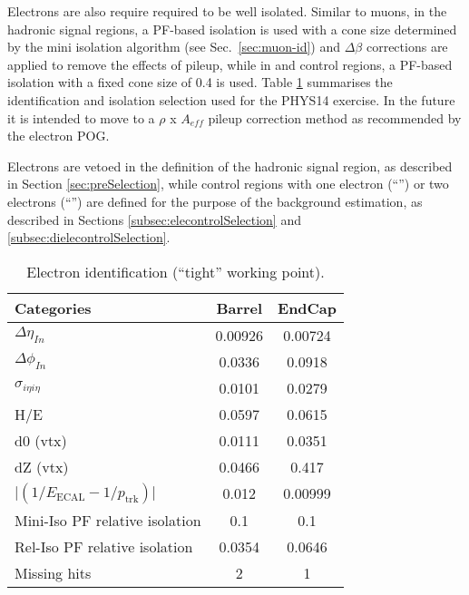 Electrons are also require required to be well isolated. 
Similar to muons, in the hadronic signal regions, a PF-based isolation \cite{pf-photon} is used with a cone size determined by the mini isolation algorithm (see Sec.~\ref{sec:muon-id}) and $\Delta \beta$ corrections are applied to remove the effects of pileup, while in \ej and \eej control regions, a PF-based isolation with a fixed cone size of 0.4 is used.
Table \ref{tab:ele-id} summarises the identification and isolation selection used for the PHYS14 exercise. In the future it is intended to move to a $\rho$ x $A_{eff}$ pileup correction method as recommended by the electron POG.

Electrons are vetoed in the definition of the hadronic signal region, 
as described in Section \ref{sec:preSelection}, while 
control regions with one electron (``\ej'') or two electrons (``\eej'') are defined for the purpose of the background estimation, 
as described in Sections \ref{subsec:elecontrolSelection} and \ref{subsec:dielecontrolSelection}.


\begin{table}[h!]
  \caption{Electron identification (``tight'' working point).\label{tab:ele-id}}
  \centering
  \footnotesize
  \begin{tabular}{ lcc }
    \hline
    \hline
    Categories                                               & Barrel    & EndCap    \\
    \hline
    $\Delta \eta_{In}$                                       & 0.00926   & 0.00724  \\
    $\Delta \phi_{In}$                                       & 0.0336    & 0.0918  \\
    $\sigma_{i\eta i\eta}$                                   & 0.0101    & 0.0279  \\
    H/E                                                      & 0.0597    & 0.0615   \\
    d0 (vtx)                                                 & 0.0111    & 0.0351  \\
    dZ (vtx)                                                 & 0.0466    & 0.417  \\
    $\lvert(1/E_{\textrm{ECAL}} - 1/p_{\textrm{trk}})\rvert$ & 0.012     & 0.00999  \\
    Mini-Iso PF relative isolation                           & 0.1       & 0.1       \\
    Rel-Iso PF relative isolation                            & 0.0354    & 0.0646       \\
    Missing hits                                             & 2         & 1         \\
    \hline
    \hline
  \end{tabular}
  \end{table}


